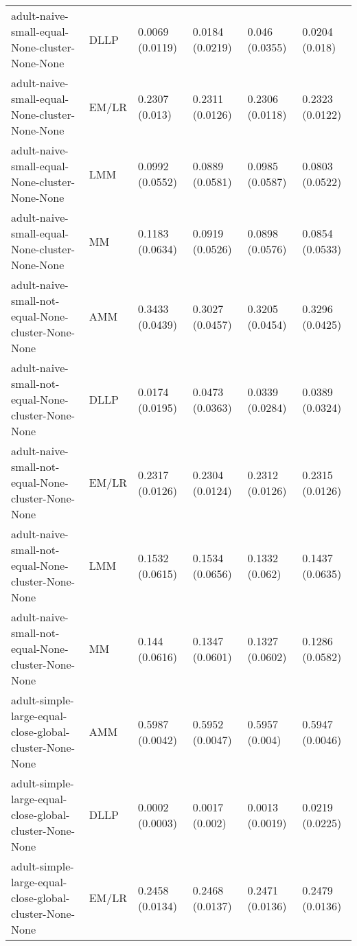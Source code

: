 \begin{tabular}{llllll}
                                         adult-naive-small-equal-None-cluster-None-None &      DLLP & 0.0069 (0.0119) &  0.0184 (0.0219) &    0.046 (0.0355) &      0.0204 (0.018) \\
                                         adult-naive-small-equal-None-cluster-None-None &     EM/LR &  0.2307 (0.013) &  0.2311 (0.0126) &   0.2306 (0.0118) &     0.2323 (0.0122) \\
                                         adult-naive-small-equal-None-cluster-None-None &       LMM & 0.0992 (0.0552) &  0.0889 (0.0581) &   0.0985 (0.0587) &     0.0803 (0.0522) \\
                                         adult-naive-small-equal-None-cluster-None-None &        MM & 0.1183 (0.0634) &  0.0919 (0.0526) &   0.0898 (0.0576) &     0.0854 (0.0533) \\
                                     adult-naive-small-not-equal-None-cluster-None-None &       AMM & 0.3433 (0.0439) &  0.3027 (0.0457) &   0.3205 (0.0454) &     0.3296 (0.0425) \\
                                     adult-naive-small-not-equal-None-cluster-None-None &      DLLP & 0.0174 (0.0195) &  0.0473 (0.0363) &   0.0339 (0.0284) &     0.0389 (0.0324) \\
                                     adult-naive-small-not-equal-None-cluster-None-None &     EM/LR & 0.2317 (0.0126) &  0.2304 (0.0124) &   0.2312 (0.0126) &     0.2315 (0.0126) \\
                                     adult-naive-small-not-equal-None-cluster-None-None &       LMM & 0.1532 (0.0615) &  0.1534 (0.0656) &    0.1332 (0.062) &     0.1437 (0.0635) \\
                                     adult-naive-small-not-equal-None-cluster-None-None &        MM &  0.144 (0.0616) &  0.1347 (0.0601) &   0.1327 (0.0602) &     0.1286 (0.0582) \\
                                adult-simple-large-equal-close-global-cluster-None-None &       AMM & 0.5987 (0.0042) &  0.5952 (0.0047) &    0.5957 (0.004) &     0.5947 (0.0046) \\
                                adult-simple-large-equal-close-global-cluster-None-None &      DLLP & 0.0002 (0.0003) &   0.0017 (0.002) &   0.0013 (0.0019) &     0.0219 (0.0225) \\
                                adult-simple-large-equal-close-global-cluster-None-None &     EM/LR & 0.2458 (0.0134) &  0.2468 (0.0137) &   0.2471 (0.0136) &     0.2479 (0.0136) \\

\end{tabular}
